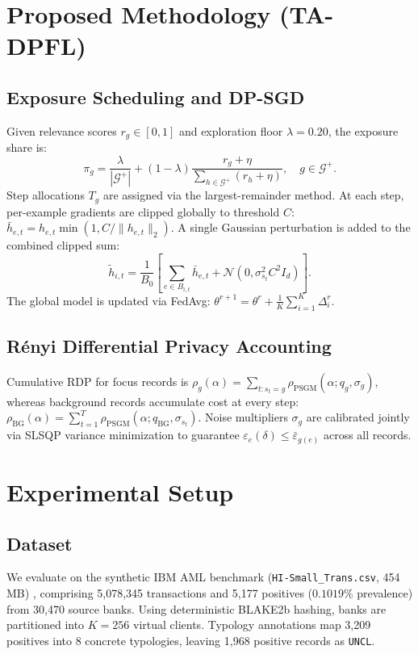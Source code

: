 \documentclass[conference]{IEEEtran}
\begin{document}
\section{Proposed Methodology (TA-DPFL)}
\subsection{Exposure Scheduling and DP-SGD}
Given relevance scores $r_g \in [0, 1]$ and exploration floor $\lambda = 0.20$, the exposure share is:
\begin{equation}
\pi_g = \frac{\lambda}{|\mathcal{G}^+|} + (1 - \lambda) \frac{r_g + \eta}{\sum_{h \in \mathcal{G}^+} (r_h + \eta)}, \quad g \in \mathcal{G}^+.
\end{equation}
Step allocations $T_g$ are assigned via the largest-remainder method. At each step, per-example gradients are clipped globally to threshold $C$: $\bar{h}_{e,t} = h_{e,t} \min(1, C / \|h_{e,t}\|_2)$. A single Gaussian perturbation is added to the combined clipped sum:
\begin{equation}
\tilde{h}_{i,t} = \frac{1}{B_0} \left[ \sum_{e \in B_{i,t}} \bar{h}_{e,t} + \mathcal{N}\left(0, \sigma_{s_t}^2 C^2 I_d\right) \right].
\end{equation}
The global model is updated via FedAvg: $\theta^{r+1} = \theta^r + \frac{1}{K} \sum_{i=1}^K \Delta_i^r$.

\subsection{R\'enyi Differential Privacy Accounting}
Cumulative RDP for focus records is $\rho_g(\alpha) = \sum_{t: s_t = g} \rho_{\text{PSGM}}(\alpha; q_g, \sigma_g)$, whereas background records accumulate cost at every step: $\rho_{\text{BG}}(\alpha) = \sum_{t=1}^T \rho_{\text{PSGM}}(\alpha; q_{\text{BG}}, \sigma_{s_t})$. Noise multipliers $\sigma_g$ are calibrated jointly via SLSQP variance minimization to guarantee $\varepsilon_e(\delta) \le \bar{\varepsilon}_{g(e)}$ across all records.

\section{Experimental Setup}
\subsection{Dataset}
We evaluate on the synthetic IBM AML benchmark (\texttt{HI-Small\_Trans.csv}, 454 MB) \cite{b21}, comprising 5,078,345 transactions and 5,177 positives ($0.1019\%$ prevalence) from 30,470 source banks. Using deterministic BLAKE2b hashing, banks are partitioned into $K = 256$ virtual clients. Typology annotations map 3,209 positives into 8 concrete typologies, leaving 1,968 positive records as \texttt{UNCL}.
\end{document}
